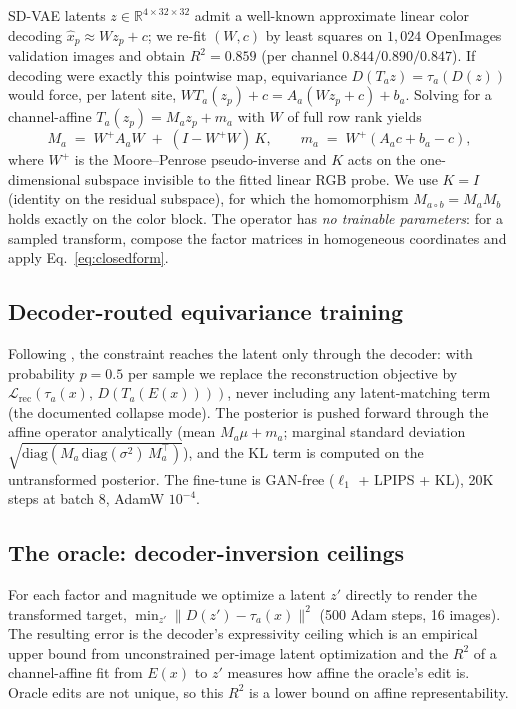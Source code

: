 \documentclass[11pt]{article}
\newcommand{\Wp}{W^{+}}
\begin{document}
SD-VAE latents $z \in \mathbb{R}^{4 \times 32 \times 32}$ admit a well-known
approximate linear color decoding $\hat{x}_p \approx W z_p + c$; we re-fit
$(W, c)$ by least squares on $1{,}024$ OpenImages validation images and obtain
$R^2 = 0.859$ (per channel $0.844/0.890/0.847$). If decoding were exactly this
pointwise map, equivariance $D(T_a z) = \tau_a(D(z))$ would force, per latent
site, $W T_a(z_p) + c = A_a(Wz_p + c) + b_a$. Solving for a channel-affine
$T_a(z_p) = M_a z_p + m_a$ with $W$ of full row rank yields
\begin{equation}
\label{eq:closedform}
M_a \;=\; \Wp A_a W \;+\; (I - \Wp W)\,K,
\qquad
m_a \;=\; \Wp\!\left(A_a c + b_a - c\right),
\end{equation}
where $\Wp$ is the Moore--Penrose pseudo-inverse and $K$ acts on the one-dimensional subspace invisible to the fitted linear RGB probe. We use $K = I$ (identity on the residual subspace), for which the
homomorphism $M_{a \circ b} = M_a M_b$ holds exactly on the color block. The
operator has \emph{no trainable parameters}: for a sampled transform, compose
the factor matrices in homogeneous coordinates and apply
Eq.~\eqref{eq:closedform}.

\subsection{Decoder-routed equivariance training}
\label{sec:training}

Following \citet{kouzelis2025eqvae}, the constraint reaches the latent only
through the decoder: with probability $p{=}0.5$ per sample we replace the
reconstruction objective by
$\mathcal{L}_\text{rec}\!\left(\tau_a(x),\, D(T_a(E(x)))\right)$, never
including any latent-matching term (the documented collapse mode). The
posterior is pushed forward through the affine operator analytically (mean
$M_a \mu + m_a$; marginal standard deviation
$\sqrt{\mathrm{diag}(M_a\,\mathrm{diag}(\sigma^2)\,M_a^\top)}$), and the KL
term is computed on the untransformed posterior. The fine-tune is GAN-free
($\ell_1$ + LPIPS + KL), 20K steps at batch 8, AdamW $10^{-4}$.

\subsection{The oracle: decoder-inversion ceilings}
\label{sec:oracle}

For each factor and magnitude we optimize a latent $z'$ directly to render the
transformed target, $\min_{z'} \lVert D(z') - \tau_a(x) \rVert^2$ (500 Adam
steps, 16 images). The resulting error is the decoder's expressivity
ceiling which is an empirical upper bound from unconstrained per-image latent optimization and the $R^2$ of a
channel-affine fit from $E(x)$ to $z'$ measures how affine the oracle's edit
is. Oracle edits are not unique, so this $R^2$ is a lower bound on affine
representability.
\end{document}
